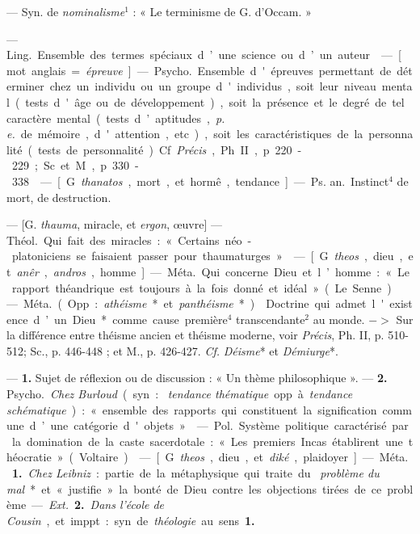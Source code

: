 \begin{itemize}[leftmargin=1cm, label=, itemsep=1pt]
 — Syn. de {\it nominalisme}$^1$ : « Le terminisme de G.
d’Occam. »

 — \si{Ling.} Ensemble des termes spéciaux d’une science ou
d’un auteur.

 — [mot anglais = {\it épreuve}] — \si{Psycho.} Ensemble d'épreuves
permettant de déterminer chez un individu ou un groupe d'individus, soit leur
niveau mental (tests d'âge ou de développement), soit la présence et le degré
de tel caractère mental (tests d’aptitudes, {\it p. e.} de mémoire,
d'attention, etc.), soit les caractéristiques de la personnalité (tests de
personnalité). Cf. {\it Précis}, Ph. II, p. 220-229; Sc. et M., p. 330-338.

 — [G. {\it thanatos}, mort, et hormê, tendance] —
\si{Ps. an.} Instinct$^4$ de mort, de destruction.

 — [G. {\it thauma}, miracle, et {\it ergon}, œuvre] —
\si{Théol.} Qui fait des miracles : « Certains néo-platoniciens se faisaient
passer pour thaumaturges. »

 — [G. {\it theos}, dieu, et {\it anêr}, {\it andros}, homme]
— \si{Méta.} Qui concerne Dieu et l’homme : « Le rapport théandrique est
toujours à la fois donné et idéal » (Le Senne).

 — \si{Méta.} (Opp. : {\it athéisme}* et
{\it panthéisme}*).  Doctrine qui admet l'existence d’un Dieu* comme cause
première$^4$ transcendante$^2$ au monde. $->$ Sur la différence entre théisme
ancien et théisme moderne, voir
{\it Précis}, Ph. II, p. 510-512; Sc., p. 446-448 ; et M., p. 426-427.
{\it Cf.} {\it Déisme}* et {\it Démiurge}*.

 — {\bf 1.} Sujet de réflexion ou de discussion : « Un thème
philosophique ». — {\bf 2.} \si{Psycho.} {\it Chez Burloud} (syn. : {\it
tendance thématique} opp. à {\it tendance schématique}) : « ensemble
des rapports qui constituent la signification commune d’une catégorie
d'objets. »

 — \si{Pol.} Système politique caractérisé par la domination
de la caste sacerdotale : « Les premiers Incas établirent une théocratie
» (Voltaire).

 — [G. {\it theos}, dieu, et {\it diké}, plaidoyer] — \si{Méta.}
{\bf 1.} {\it Chez Leibniz} : partie de la métaphysique qui traite du {\it
problème du mal}* et « justifie » la bonté de Dieu contre les objections
tirées de ce problème. — {\it Ext.} {\bf 2.} {\it Dans l'école de Cousin}, et
imppt : syn. de {\it théologie} au sens {\bf 1.}


\end{itemize}
